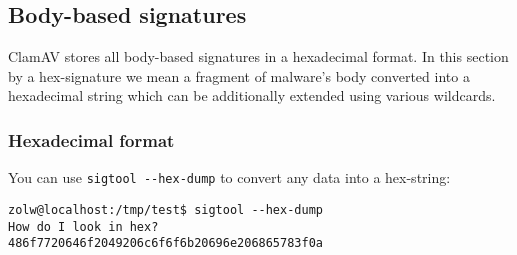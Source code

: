 \documentclass[a4paper,titlepage,12pt]{article}
\begin{document}
    \subsection{Body-based signatures}
    ClamAV stores all body-based signatures in a hexadecimal format. In this
    section by a hex-signature we mean a fragment of malware's body converted
    into a hexadecimal string which can be additionally extended using various
    wildcards.

    \subsubsection{Hexadecimal format}
    You can use \verb+sigtool --hex-dump+ to convert any data into a hex-string:
    \begin{verbatim}
zolw@localhost:/tmp/test$ sigtool --hex-dump
How do I look in hex?
486f7720646f2049206c6f6f6b20696e206865783f0a
    \end{verbatim}
\end{document}
